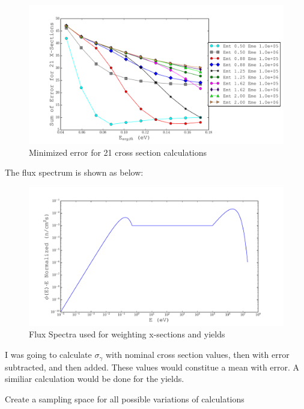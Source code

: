 \documentclass[11pt,notitlepage]{article}
\begin{document}
\begin{todolist}
  \begin{figure}[H]
    \begin{center}
      \includegraphics[width=0.77\columnwidth]{../Weighting/Reduce_Err/E0_vs_SumErr_old.pdf}
      \vspace{-5mm}
      \caption{Minimized error for 21 cross section calculations}
      \label{fig:err}
    \end{center}
  \end{figure}
  
  The flux spectrum is shown as below:

  \begin{figure}[H]
    \begin{center}
      \includegraphics[width=0.77\columnwidth]{../Weighting/Flux_Spectra.pdf}
      \vspace{-5mm}
      \caption{Flux Spectra used for weighting x-sections and yields}
      \label{fig:Flux}
    \end{center}
  \end{figure}
  
  I was going to calculate $\sigma_\gamma$ with nominal cross section
  values, then with error subtracted, and then added. These values would
  constitue a mean with error. A similiar calculation would be done for
  the yields.

  

  
    
\item{Create a sampling space for all possible variations of
  calculations}


\end{todolist}
\end{document}
